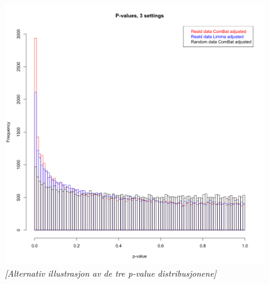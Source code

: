 \documentclass{bio}
\newcommand\NB[1]{\textcolor{NBcol}{\textit{#1}}} %
\newcommand\NOTE[1]{\NB{[#1]}} %
\begin{document}
\begin{figure}[!p]
\centering\includegraphics[width=13cm]{Fig/pvaluesjohnson2.png}
\caption{
\NOTE{Alternativ illustrasjon av de tre p-value distribusjonene}
}
\label{fig:pdist-johnson}
\end{figure}


\end{document}
